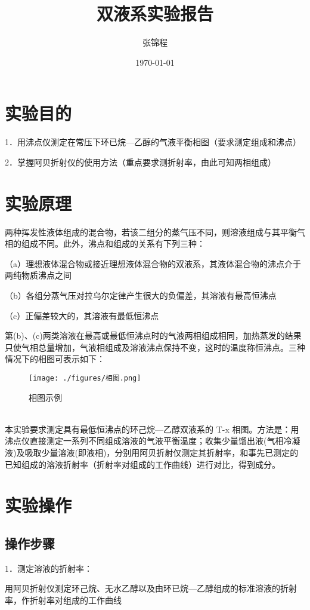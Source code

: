 \documentclass[4pt,a4papper]{article}
\title{\zihao{-2}\textbf{双液系实验报告}}
\author{张锦程}
\date{\today}
\begin{document}
\maketitle

\section{实验目的}
1．用沸点仪测定在常压下环已烷—乙醇的气液平衡相图（要求测定组成和沸点）

2．掌握阿贝折射仪的使用方法（重点要求测折射率，由此可知两相组成）

\section{实验原理}
两种挥发性液体组成的混合物，若该二组分的蒸气压不同，则溶液组成与其平衡气相的组成不同。此外，沸点和组成的关系有下列三种：

（a）理想液体混合物或接近理想液体混合物的双液系，其液体混合物的沸点介于两纯物质沸点之间

（b）各组分蒸气压对拉乌尔定律产生很大的负偏差，其溶液有最高恒沸点

（c）正偏差较大的，其溶液有最低恒沸点

第(b)、(c)两类溶液在最高或最低恒沸点时的气液两相组成相同，加热蒸发的结果只使气相总量增加，气液相组成及溶液沸点保持不变，这时的温度称恒沸点。三种情况下的相图可表示如下：
    \begin{figure}[htb]
        \centering
        \texttt{[image: ./figures/相图.png]}
        \caption{相图示例} \label{fig: 1}
    \end{figure}
~\\
本实验要求测定具有最低恒沸点的环己烷—乙醇双液系的 T-x 相图。方法是：用沸点仪直接测定一系列不同组成溶液的气液平衡温度；收集少量馏出液(气相冷凝液)及吸取少量溶液(即液相)，分别用阿贝折射仅测定其折射率，和事先已测定的已知组成的溶液折射率（折射率对组成的工作曲线）进行对比，得到成分。

\section{实验操作}
\subsection{操作步骤}
1．测定溶液的折射率：

用阿贝折射仪测定环己烷、无水乙醇以及由环已烷—乙醇组成的标准溶液的折射率，作折射率对组成的工作曲线
\end{document}
